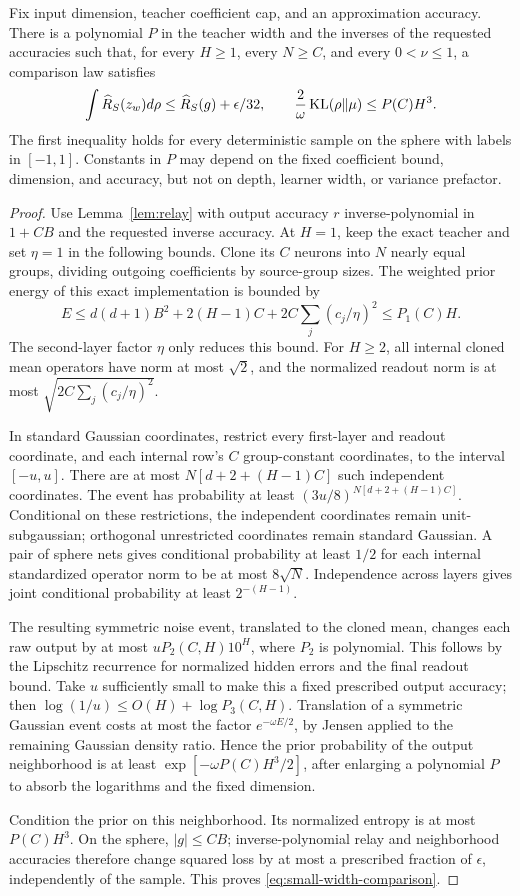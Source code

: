 \begin{lemma}
\label{lem:small-comparison}
Fix input dimension, teacher coefficient cap, and an approximation accuracy. There is a polynomial $P$ in the teacher width and the inverses of the requested accuracies such that, for every $H\ge1$, every $N\ge C$, and every $0<\nu\le1$, a comparison law satisfies
\[
 \int\widehat R_S(z_w)d\rho\le\widehat R_S(g)+\epsilon/32,
 \qquad \frac2\omega\operatorname{KL}(\rho\Vert\mu)\le P(C)H^3.
 \label{eq:small-width-comparison}
\]
The first inequality holds for every deterministic sample on the sphere with labels in $[-1,1]$. Constants in $P$ may depend on the fixed coefficient bound, dimension, and accuracy, but not on depth, learner width, or variance prefactor.
\end{lemma}
\begin{proof}
Use Lemma~\ref{lem:relay} with output accuracy $r$ inverse-polynomial in $1+CB$ and the requested inverse accuracy. At $H=1$, keep the exact teacher and set $\eta=1$ in the following bounds. Clone its $C$ neurons into $N$ nearly equal groups, dividing outgoing coefficients by source-group sizes. The weighted prior energy of this exact implementation is bounded by
\[
 E\le d(d+1)B^2+2(H-1)C+2C\sum_j(c_j/\eta)^2
 \le P_1(C)H.
\]
The second-layer factor $\eta$ only reduces this bound. For $H\ge2$, all internal cloned mean operators have norm at most $\sqrt2$, and the normalized readout norm is at most $\sqrt{2C\sum_j(c_j/\eta)^2}$.

In standard Gaussian coordinates, restrict every first-layer and readout coordinate, and each internal row's $C$ group-constant coordinates, to the interval $[-u,u]$. There are at most $N[d+2+(H-1)C]$ such independent coordinates. The event has probability at least $(3u/8)^{N[d+2+(H-1)C]}$. Conditional on these restrictions, the independent coordinates remain unit-subgaussian; orthogonal unrestricted coordinates remain standard Gaussian. A pair of sphere nets gives conditional probability at least $1/2$ for each internal standardized operator norm to be at most $8\sqrt N$. Independence across layers gives joint conditional probability at least $2^{-(H-1)}$.

The resulting symmetric noise event, translated to the cloned mean, changes each raw output by at most $uP_2(C,H)10^H$, where $P_2$ is polynomial. This follows by the Lipschitz recurrence for normalized hidden errors and the final readout bound. Take $u$ sufficiently small to make this a fixed prescribed output accuracy; then
$\log(1/u)\le O(H)+\log P_3(C,H)$.
Translation of a symmetric Gaussian event costs at most the factor $e^{-\omega E/2}$, by Jensen applied to the remaining Gaussian density ratio. Hence the prior probability of the output neighborhood is at least $\exp[-\omega P(C)H^3/2]$, after enlarging a polynomial $P$ to absorb the logarithms and the fixed dimension.

Condition the prior on this neighborhood. Its normalized entropy is at most $P(C)H^3$. On the sphere, $|g|\le CB$; inverse-polynomial relay and neighborhood accuracies therefore change squared loss by at most a prescribed fraction of $\epsilon$, independently of the sample. This proves \eqref{eq:small-width-comparison}.
\end{proof}

